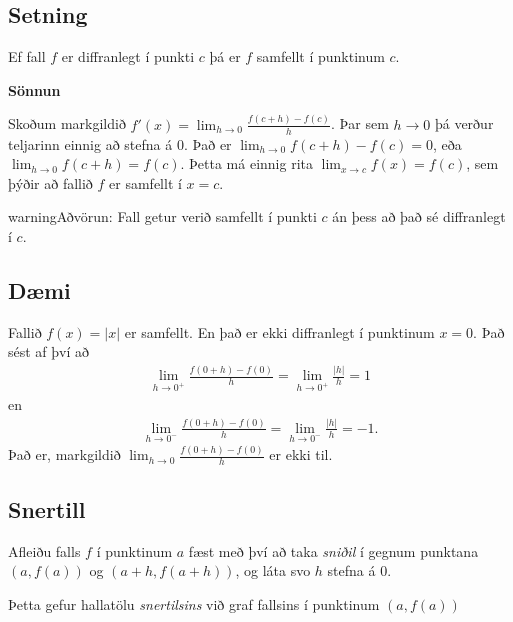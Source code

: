 \documentclass[b5paper,11pt,icelandic]{sphinxmanual}
\begin{document}
\subsection{Setning}
\label{kafli03:setning}
Ef fall \(f\) er diffranlegt í punkti \(c\) þá er \(f\)
samfellt í punktinum \(c\).

\textbf{Sönnun}

Skoðum markgildið \(f'(x)=\lim_{h\to 0} \frac{f(c+h)-f(c)}{h}\). Þar
sem \(h\to 0\) þá verður teljarinn einnig að stefna á 0. Það er
\(\lim_{h \to 0} f(c+h)-f(c) = 0\), eða
\(\lim_{h \to 0} f(c+h) = f(c)\). Þetta má einnig rita
\(\lim_{x \to c} f(x) = f(c)\), sem þýðir að fallið \(f\) er
samfellt í \(x=c\).

\begin{notice}{warning}{Aðvörun:}
Fall getur verið samfellt í punkti \(c\) án þess að það sé
diffranlegt í \(c\).
\end{notice}


\subsection{Dæmi}
\label{kafli03:id1}
Fallið \(f(x) = |x|\) er samfellt. En það er ekki diffranlegt í
punktinum \(x=0\). Það sést af því að
\begin{equation*}
\begin{split}\lim_{h\to 0^+} \frac{f(0+h)-f(0)}{h} = \lim_{h\to 0^+} \frac{|h|}{h} = 1\end{split}
\end{equation*}
en
\begin{equation*}
\begin{split}\lim_{h\to 0^-} \frac{f(0+h)-f(0)}{h} = \lim_{h\to 0^-} \frac{|h|}{h} = -1.\end{split}
\end{equation*}
Það er, markgildið \(\lim_{h\to 0} \frac{f(0+h)-f(0)}{h}\) er ekki til.


\subsection{Snertill}
\label{kafli03:snertill}\label{kafli03:index-1}
Afleiðu falls \(f\) í punktinum \(a\) fæst með því að taka
\textit{sniðil} í gegnum punktana \((a,f(a))\) og \((a+h,f(a+h))\), og
láta svo \(h\) stefna á \(0\).

Þetta gefur hallatölu \textit{snertilsins} við graf fallsins í punktinum
\((a,f(a))\)
\end{document}

